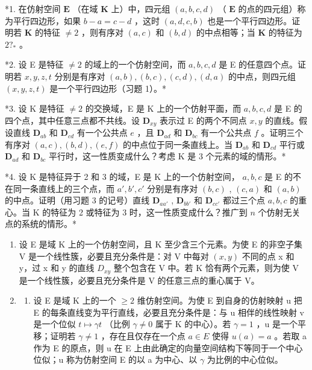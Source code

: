 \BourbakiExercisesSection

*1. 在仿射空间 \(\mathbf{E}\) （在域 \(\mathbf{K}\) 上）中，四元组 \((a, b, c, d)\) （ \(\mathbf{E}\) 的点的四元组）称为平行四边形，如果 \(b - a = c - d\) ，这时 \((a, d, c, b)\) 也是一个平行四边形。证明若 \(\mathbf{K}\) 的特征 \(\neq 2\) ，则有序对 \((a, c)\) 和 \((b, d)\) 的中点相等；当 \(\mathbf{K}\) 的特征为 \(2?_{*}\) 。

*2. 设 E 是特征 \(\neq 2\) 的域上的一个仿射空间，而 \(a, b, c, d\) 是 E 的任意四个点。证明若 \(x, y, z, t\) 分别是有序对 \((a, b), (b, c), (c, d), (d, a)\) 的中点，则四元组 \((x, y, z, t)\) 是一个平行四边形（习题 1）。*

*3. 设 K 是特征 \(\neq 2\) 的交换域，E 是 K 上的一个仿射平面，而 \(a, b, c, d\) 是 E 的四个点，其中任意三点都不共线。设 \(\mathbf{D}_{xy}\) 表示过 E 的两个不同点 \(x, y\) 的直线。假设直线 \(\mathbf{D}_{ab}\) 和 \(\mathbf{D}_{cd}\) 有一个公共点 \(e\) ，且 \(\mathbf{D}_{ad}\) 和 \(\mathbf{D}_{bc}\) 有一个公共点 \(f\) 。证明三个有序对 \((a, c), (b, d), (e, f)\) 的中点位于同一条直线上。当 \(\mathbf{D}_{ab}\) 和 \(\mathbf{D}_{cd}\) 平行或 \(\mathbf{D}_{ad}\) 和 \(\mathbf{D}_{bc}\) 平行时，这一性质变成什么？考虑 K 是 3 个元素的域的情形。*

*4. 设 K 是特征异于 2 和 3 的域，E 是 K 上的一个仿射空间， \(a, b, c\) 是 E 的不在同一条直线上的三个点，而 \(a', b', c'\) 分别是有序对 \((b, c)\) , \((c, a)\) 和 \((a, b)\) 的中点。证明（用习题 3 的记号）直线 \(\mathbf{D}_{aa'}\) , \(\mathbf{D}_{bb'}\) 和 \(\mathbf{D}_{cc'}\) 都过三个点 \(a, b, c\) 的重心。当 K 的特征为 2 或特征为 3 时，这一性质变成什么？推广到 \(n\) 个仿射无关点的系统的情形。*

\begin{enumerate}
\def\labelenumi{\arabic{enumi}.}
\setcounter{enumi}{4}
\item
  设 E 是域 K 上的一个仿射空间，且 K 至少含三个元素。为使 E 的非空子集 V 是一个线性簇，必要且充分条件是：对 V 中每对 \((x,y)\) 不同的点 x 和 y，过 x 和 y 的直线 \(D_{xy}\) 整个包含在 V 中。若 K 恰有两个元素，则为使 V 是一个线性簇，必要且充分条件是 V 的任意三点的重心属于 V。
\item
  \begin{enumerate}
  \def\labelenumii{(\alph{enumii})}
  \tightlist
  \item
    设 E 是域 K 上的一个 \(\geqslant2\) 维仿射空间。为使 E 到自身的仿射映射 u 把 E 的每条直线变为平行直线，必要且充分条件是：与 u 相伴的线性映射 v 是一个位似 \(t\mapsto\gamma t\) （比例 \(\gamma\neq0\) 属于 K 的中心）。若 \(\gamma=1\) ，u 是一个平移；证明若 \(\gamma\neq1\) ，存在且仅存在一个点 \(a\in E\) 使得 \(u(a)=a\) 。若取 a 作为 E 的原点，则 u 在 E 上由此确定的向量空间结构下等同于一个中心位似；u 称为仿射空间 E 的以 a 为中心、以 \(\gamma\) 为比例的中心位似。
  \end{enumerate}
\end{enumerate}

